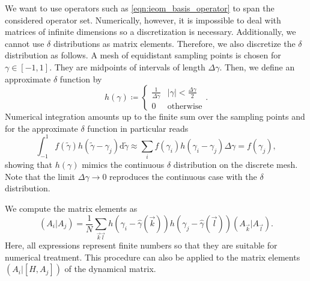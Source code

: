 \documentclass[
    reprint, 
    aps,
    preprintnumbers,
    twocolumn,
    prb,
    superscriptaddress
]{revtex4-2}
\newcommand{\vk}{\vec{k}}
\newcommand{\vl}{\vec{l}}
\begin{document}
We want to use operators such as \eqref{eqn:ieom_basis_operator} to span the considered operator set.
Numerically, however, it is impossible to deal with matrices of infinite dimensions so a discretization is necessary.
Additionally, we cannot use $\delta$ distributions as matrix elements. 
Therefore, we also discretize the $\delta$ distribution as follows.
A mesh of equidistant sampling points is chosen for $\gamma\in[-1,1]$.
They are midpoints of intervals of length $\Delta \gamma$.
Then, we define an approximate $\delta$ function by
\begin{equation}
    h(\gamma) \coloneqq \begin{cases}
        \frac{1}{\Delta \gamma} & |\gamma| < \frac{\Delta \gamma}{2} \\ 0 & \text{otherwise}
    \end{cases}.
\end{equation}
Numerical integration amounts up to the finite sum over the sampling points and for the approximate $\delta$ function in particular reads
\begin{equation}
    \int_{-1}^1 f(\tilde{\gamma}) h(\tilde{\gamma} - \gamma_j) \mathrm{d} \tilde{\gamma} \approx 
		\sum_i f(\gamma_i) h(\gamma_i - \gamma_j) \Delta \gamma = f(\gamma_j),
\end{equation}
showing that $h(\gamma)$ mimics the continuous $\delta$ distribution on the discrete mesh.
Note that the limit $\Delta \gamma \to 0$ reproduces the continuous case with the $\delta$ distribution.

We compute the matrix elements as
\begin{equation}
    \label{eqn:numerical_example}
    (A_i | A_j) = \frac{1}{N} \sum_{\vk \vl} h(\gamma_i - \widehat{\gamma}(\vk)) h(\gamma_j - 
		\widehat{\gamma}(\vl)) (A_{\vk} | A_{\vl}).
\end{equation}
Here, all expressions represent finite numbers so that they are suitable for
numerical treatment. This procedure can also be applied to the matrix elements $(A_i | [H, A_j])$ of the dynamical matrix.
\end{document}
